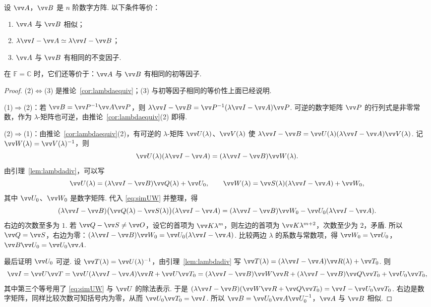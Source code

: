 	\begin{theorem}[相似判定定理]\label{thm:similarity}
		设 $\vv A$，$\vv B$ 是 $n$ 阶数字方阵. 以下条件等价：
		\begin{enumerate}
			\item $\vv A$ 与 $\vv B$ 相似；
			\item $\lambda\vv I-\vv A\simeq\lambda\vv I-\vv B$；
			\item $\vv A$ 与 $\vv B$ 有相同的不变因子.
		\end{enumerate}
		在 $\mathbb{F}=\mathbb{C}$ 时，它们还等价于：$\vv A$ 与 $\vv B$ 有相同的初等因子.
	\end{theorem}
	\begin{proof}
		(2)$\Leftrightarrow$(3) 是推论~\ref{cor:lambdaequiv}；(3) 与初等因子相同的等价性上面已经说明.
		
		(1)$\Rightarrow$(2)：若 $\vv B=\vv P^{-1}\vv A\vv P$，则 $\lambda\vv I-\vv B=\vv P^{-1}(\lambda\vv I-\vv A)\vv P$. 可逆的数字矩阵 $\vv P$ 的行列式是非零常数，作为 $\lambda$-矩阵也可逆，由推论~\ref{cor:lambdaequiv}(2) 即得.
		
		(2)$\Rightarrow$(1)：由推论~\ref{cor:lambdaequiv}(2)，有可逆的 $\lambda$-矩阵 $\vv U(\lambda)$、$\vv V(\lambda)$ 使 $\lambda\vv I-\vv B=\vv U(\lambda)(\lambda\vv I-\vv A)\vv V(\lambda)$. 记 $\vv W(\lambda)=\vv V(\lambda)^{-1}$，则
		\begin{equation}\label{eq:simUW}
			\vv U(\lambda)(\lambda\vv I-\vv A)=(\lambda\vv I-\vv B)\vv W(\lambda).
		\end{equation}
		由引理~\ref{lem:lambdadiv}，可以写
		\[\vv U(\lambda)=(\lambda\vv I-\vv B)\vv Q(\lambda)+\vv U_0,\qquad \vv W(\lambda)=\vv S(\lambda)(\lambda\vv I-\vv A)+\vv W_0,\]
		其中 $\vv U_0$、$\vv W_0$ 是数字矩阵. 代入 \eqref{eq:simUW} 并整理，得
		\[(\lambda\vv I-\vv B)\big(\vv Q(\lambda)-\vv S(\lambda)\big)(\lambda\vv I-\vv A)=(\lambda\vv I-\vv B)\vv W_0-\vv U_0(\lambda\vv I-\vv A).\]
		右边的次数至多为 $1$. 若 $\vv Q-\vv S\ne\vv O$，设它的首项为 $\vv K\lambda^m$，则左边的首项为 $\vv K\lambda^{m+2}$，次数至少为 $2$，矛盾. 所以 $\vv Q=\vv S$，右边为零：$(\lambda\vv I-\vv B)\vv W_0=\vv U_0(\lambda\vv I-\vv A)$. 比较两边 $\lambda$ 的系数与常数项，得 $\vv W_0=\vv U_0$，$\vv B\vv U_0=\vv U_0\vv A$.
		
		最后证明 $\vv U_0$ 可逆. 设 $\vv T(\lambda)=\vv U(\lambda)^{-1}$，由引理~\ref{lem:lambdadiv} 写 $\vv T(\lambda)=(\lambda\vv I-\vv A)\vv R(\lambda)+\vv T_0$. 则
		\[\vv I=\vv U\vv T=\vv U(\lambda\vv I-\vv A)\vv R+\vv U\vv T_0=(\lambda\vv I-\vv B)\vv W\vv R+(\lambda\vv I-\vv B)\vv Q\vv T_0+\vv U_0\vv T_0,\]
		其中第三个等号用了 \eqref{eq:simUW} 与 $\vv U$ 的除法表示. 于是 $(\lambda\vv I-\vv B)(\vv W\vv R+\vv Q\vv T_0)=\vv I-\vv U_0\vv T_0$. 右边是数字矩阵，同样比较次数可知括号内为零，从而 $\vv U_0\vv T_0=\vv I$. 所以 $\vv B=\vv U_0\vv A\vv U_0^{-1}$，$\vv A$ 与 $\vv B$ 相似.
	\end{proof}
	
